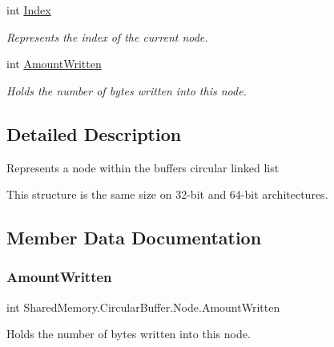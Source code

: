 \begin{DoxyCompactItemize}
int \hyperlink{struct_shared_memory_1_1_circular_buffer_1_1_node_a4b2a3883579843b7b265a9a8f482e5d7}{Index}
\begin{DoxyCompactList}\small\item\em Represents the index of the current node. \end{DoxyCompactList}\item 
int \hyperlink{struct_shared_memory_1_1_circular_buffer_1_1_node_a6af4949dfc5fb4b751fe774f29f4ce87}{Amount\+Written}
\begin{DoxyCompactList}\small\item\em Holds the number of bytes written into this node. \end{DoxyCompactList}\end{DoxyCompactItemize}


\subsection{Detailed Description}
Represents a node within the buffer\textquotesingle{}s circular linked list 

This structure is the same size on 32-\/bit and 64-\/bit architectures.

\subsection{Member Data Documentation}
\mbox{\label{struct_shared_memory_1_1_circular_buffer_1_1_node_a6af4949dfc5fb4b751fe774f29f4ce87}} 
\subsubsection{\texorpdfstring{Amount\+Written}{AmountWritten}}
{\footnotesize\ttfamily int Shared\+Memory.\+Circular\+Buffer.\+Node.\+Amount\+Written}



Holds the number of bytes written into this node. 

\mbox{\label{struct_shared_memory_1_1_circular_buffer_1_1_node_aae426a592827275557a3bb265c25fa54}} 
